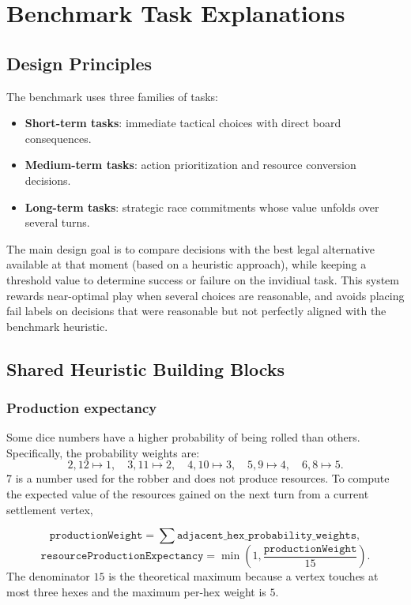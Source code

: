 \documentclass[letter,  12 pt]{article}
\begin{document}
\appendix

\section{Benchmark Task Explanations}
\label{app:benchmark-task-explanations}

\subsection{Design Principles}

The benchmark uses three families of tasks:
\begin{itemize}
    \item \textbf{Short-term tasks}: immediate tactical choices with direct board consequences.
    \item \textbf{Medium-term tasks}: action prioritization and resource conversion decisions.
    \item \textbf{Long-term tasks}: strategic race commitments whose value unfolds over several turns.
\end{itemize}

The main design goal is to compare decisions with the best legal alternative available at that moment (based on a heuristic approach), while keeping a threshold value to determine success or failure on the invidiual task.  
This system rewards near-optimal play when several choices are reasonable, and avoids placing fail labels on decisions that were reasonable but not perfectly aligned with the benchmark heuristic. 

\subsection{Shared Heuristic Building Blocks}
\label{app:shared-heuristic-building-blocks}

\subsubsection{Production expectancy}
\label{app:production-expectancy}
Some dice numbers have a higher probability of being rolled than others. Specifically, the probability weights are:
\[
2,12 \mapsto 1,\quad 3,11 \mapsto 2,\quad 4,10 \mapsto 3,\quad 5,9 \mapsto 4,\quad 6,8 \mapsto 5.
\]
7 is a number used for the robber and does not produce resources. To compute the expected value of the resources gained on the next turn from a current settlement vertex, 

\[
\texttt{productionWeight} = \sum \texttt{adjacent\_hex\_probability\_weights},
\]
\[
\texttt{resourceProductionExpectancy} = \min\left(1, \frac{\texttt{productionWeight}}{15}\right).
\]
The denominator $15$ is the theoretical maximum because a vertex touches at most three hexes and the maximum per-hex weight is $5$.
\end{document}
